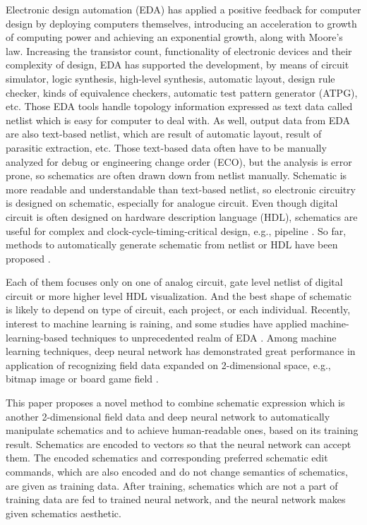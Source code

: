 \documentclass[twocolumn]{article}
\begin{document}
Electronic design automation (EDA) has applied a positive feedback
for computer design by deploying computers themselves,
introducing an acceleration to growth of computing power
and achieving an exponential growth, along with Moore's law.
Increasing the transistor count,
functionality of electronic devices and their complexity of design,
EDA has supported the development, by means of circuit simulator,
logic synthesis, high-level synthesis, automatic layout,
design rule checker, kinds of equivalence checkers,
automatic test pattern generator (ATPG), etc.
Those EDA tools handle topology information expressed as text data
called netlist which is easy for computer to deal with.
As well, output data from EDA are also text-based netlist,
which are result of automatic layout, result of parasitic extraction, etc.
Those text-based data often have to be manually analyzed
for debug or engineering change order (ECO),
but the analysis is error prone,
so schematics are often drawn down from netlist manually.
Schematic is more readable and understandable than text-based netlist,
so electronic circuitry is designed on schematic,
especially for analogue circuit.
Even though digital circuit is often designed
on hardware description language (HDL),
schematics are useful for complex and clock-cycle-timing-critical design,
e.g., pipeline \cite{ph}.
So far, methods to automatically generate schematic from netlist or HDL
have been proposed
\cite{nauts}
\cite{anshul}
\cite{fiduccia}
\cite{chun}
\cite{green}
\cite{tsung}
\cite{bogdan}.

Each of them focuses only on one of analog circuit,
gate level netlist of digital circuit
or more higher level HDL visualization.
And the best shape of schematic is likely to depend on
type of circuit, each project, or each individual.
Recently, interest to machine learning is raining,
and some studies have applied machine-learning-based techniques
to unprecedented realm of EDA \cite{fan} \cite{sourav}.
Among machine learning techniques,
deep neural network has demonstrated great performance
in application of recognizing field data
expanded on 2-dimensional space,
e.g., bitmap image or board game field \cite{nips} \cite{alphago}.

This paper proposes a novel method to combine schematic expression
which is another 2-dimensional field data
and deep neural network to automatically manipulate schematics
and to achieve human-readable ones, based on its training result.
Schematics are encoded to vectors so that the neural network can accept them.
The encoded schematics and corresponding preferred schematic edit commands,
which are also encoded and do not change semantics of schematics,
are given as training data.
After training, schematics which are not a part of training data
are fed to trained neural network,
and the neural network makes given schematics aesthetic.
\end{document}
